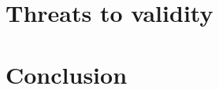 \documentclass[conference]{IEEEtran}
\begin{document}
\section{Threats to validity}



\section{Conclusion}
\newpage
{}

\end{document}
